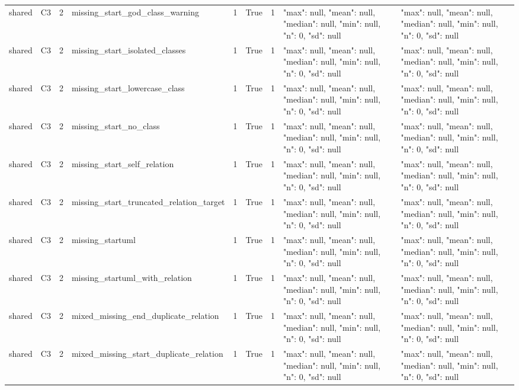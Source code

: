 \begin{tabular}{lllllllll}
shared & C3 & 2 & missing\_start\_god\_class\_warning & 1 & True & 1 & {"max": null, "mean": null, "median": null, "min": null, "n": 0, "sd": null} & {"max": null, "mean": null, "median": null, "min": null, "n": 0, "sd": null} \\
shared & C3 & 2 & missing\_start\_isolated\_classes & 1 & True & 1 & {"max": null, "mean": null, "median": null, "min": null, "n": 0, "sd": null} & {"max": null, "mean": null, "median": null, "min": null, "n": 0, "sd": null} \\
shared & C3 & 2 & missing\_start\_lowercase\_class & 1 & True & 1 & {"max": null, "mean": null, "median": null, "min": null, "n": 0, "sd": null} & {"max": null, "mean": null, "median": null, "min": null, "n": 0, "sd": null} \\
shared & C3 & 2 & missing\_start\_no\_class & 1 & True & 1 & {"max": null, "mean": null, "median": null, "min": null, "n": 0, "sd": null} & {"max": null, "mean": null, "median": null, "min": null, "n": 0, "sd": null} \\
shared & C3 & 2 & missing\_start\_self\_relation & 1 & True & 1 & {"max": null, "mean": null, "median": null, "min": null, "n": 0, "sd": null} & {"max": null, "mean": null, "median": null, "min": null, "n": 0, "sd": null} \\
shared & C3 & 2 & missing\_start\_truncated\_relation\_target & 1 & True & 1 & {"max": null, "mean": null, "median": null, "min": null, "n": 0, "sd": null} & {"max": null, "mean": null, "median": null, "min": null, "n": 0, "sd": null} \\
shared & C3 & 2 & missing\_startuml & 1 & True & 1 & {"max": null, "mean": null, "median": null, "min": null, "n": 0, "sd": null} & {"max": null, "mean": null, "median": null, "min": null, "n": 0, "sd": null} \\
shared & C3 & 2 & missing\_startuml\_with\_relation & 1 & True & 1 & {"max": null, "mean": null, "median": null, "min": null, "n": 0, "sd": null} & {"max": null, "mean": null, "median": null, "min": null, "n": 0, "sd": null} \\
shared & C3 & 2 & mixed\_missing\_end\_duplicate\_relation & 1 & True & 1 & {"max": null, "mean": null, "median": null, "min": null, "n": 0, "sd": null} & {"max": null, "mean": null, "median": null, "min": null, "n": 0, "sd": null} \\
shared & C3 & 2 & mixed\_missing\_start\_duplicate\_relation & 1 & True & 1 & {"max": null, "mean": null, "median": null, "min": null, "n": 0, "sd": null} & {"max": null, "mean": null, "median": null, "min": null, "n": 0, "sd": null} \\

\end{tabular}
